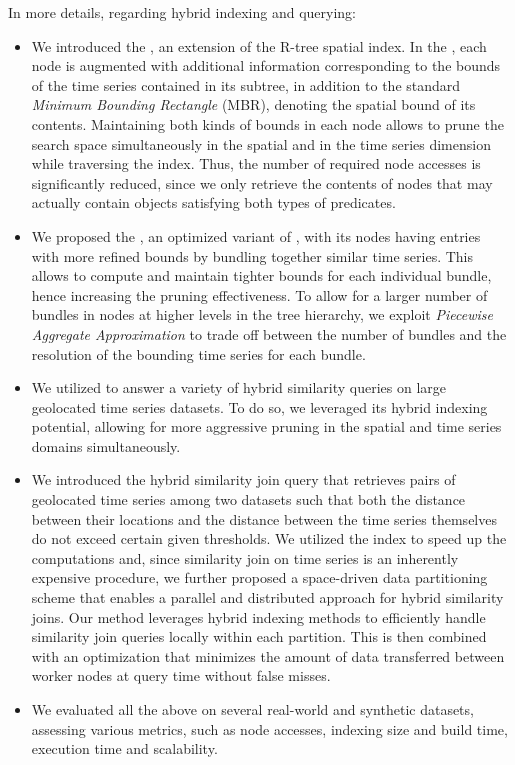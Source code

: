 In more details, regarding hybrid indexing and querying:
\begin{itemize}
	\item We introduced the \textit{\tsr}, an extension of the R-tree spatial index. In the \tsr, each node is augmented with additional information corresponding to the bounds of the time series contained in its subtree, in addition to the standard \emph{Minimum Bounding Rectangle} (MBR), denoting the spatial bound of its contents. Maintaining both kinds of bounds in each node allows to prune the search space simultaneously in the spatial and in the time series dimension while traversing the index. Thus, the number of required node accesses is significantly reduced, since we only retrieve the contents of nodes that may actually contain objects satisfying both types of predicates.
	\item We proposed the \textit{\btsr}, an optimized variant of \textit{\tsr}, with its nodes having entries with more refined bounds by bundling together similar time series. This allows to compute and maintain tighter bounds for each individual bundle, hence increasing the pruning effectiveness. To allow for a larger number of bundles in nodes at higher levels in the tree hierarchy, we exploit \emph{Piecewise Aggregate Approximation} \cite{keogh2001paa,faloutsos2000vldb} to trade off between the number of bundles and the resolution of the bounding time series for each bundle.
	\item We utilized \btsr to answer a variety of hybrid similarity queries on large geolocated time series datasets. To do so, we leveraged its hybrid indexing potential, allowing for more aggressive pruning in the spatial and time series domains simultaneously.
	\item We introduced the hybrid similarity join query that retrieves pairs of geolocated time series among two datasets such that both the distance between their locations and the distance between the time series themselves do not exceed certain given thresholds. We utilized the \btsr index to speed up the computations and, since similarity join on time series is an inherently expensive procedure, we further proposed a space-driven data partitioning scheme that enables a parallel and distributed approach for hybrid similarity joins. Our method leverages hybrid indexing methods to efficiently handle similarity join queries locally within each partition. This is then combined with an optimization that minimizes the amount of data transferred between worker nodes at query time without false misses.
	\item We evaluated all the above on several real-world and synthetic datasets, assessing various metrics, such as node accesses, indexing size and build time, execution time and scalability.
\end{itemize}

